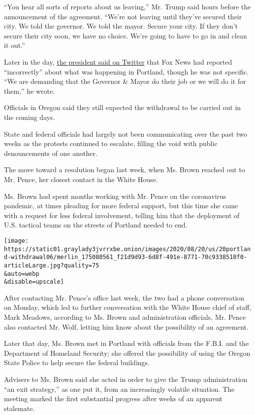 ``You hear all sorts of reports about us leaving,'' Mr. Trump said hours
before the announcement of the agreement. ``We're not leaving until
they've secured their city. We told the governor. We told the mayor.
Secure your city. If they don't secure their city soon, we have no
choice. We're going to have to go in and clean it out.''

Later in the day,
\href{https://twitter.com/realDonaldTrump/status/1288599151349923840}{the
president said on Twitter} that Fox News had reported ``incorrectly''
about what was happening in Portland, though he was not specific. ``We
are demanding that the Governor \& Mayor do their job or we will do it
for them,'' he wrote.

Officials in Oregon said they still expected the withdrawal to be
carried out in the coming days.

State and federal officials had largely not been communicating over the
past two weeks as the protests continued to escalate, filling the void
with public denouncements of one another.

The move toward a resolution began last week, when Ms. Brown reached out
to Mr. Pence, her closest contact in the White House.

Ms. Brown had spent months working with Mr. Pence on the coronavirus
pandemic, at times pleading for more federal support, but this time she
came with a request for less federal involvement, telling him that the
deployment of U.S. tactical teams on the streets of Portland needed to
end.

\texttt{[image: https://static01.graylady3jvrrxbe.onion/images/2020/08/20/us/20portland-withdrawal06/merlin\_175080561\_f21d9d93-6d8f-491e-8771-70c9338510f0-articleLarge.jpg?quality=75\\\&auto=webp\\\&disable=upscale]}

After contacting Mr. Pence's office last week, the two had a phone
conversation on Monday, which led to further conversation with the White
House chief of staff, Mark Meadows, according to Ms. Brown and
administration officials. Mr. Pence also contacted Mr. Wolf, letting him
know about the possibility of an agreement.

Later that day, Ms. Brown met in Portland with officials from the F.B.I.
and the Department of Homeland Security; she offered the possibility of
using the Oregon State Police to help secure the federal buildings.

Advisers to Ms. Brown said she acted in order to give the Trump
administration ``an exit strategy,'' as one put it, from an increasingly
volatile situation. The meeting marked the first substantial progress
after weeks of an apparent stalemate.

